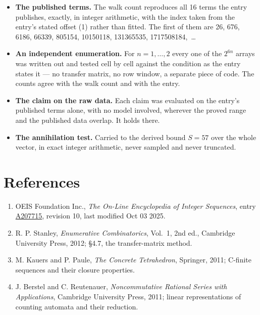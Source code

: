 \documentclass[11pt]{article}
\theoremstyle{definition}
\begin{document}
\begin{itemize}

\item {\bfseries The published terms.} The walk count reproduces all 16 terms the entry publishes, exactly, in integer arithmetic, with the index taken from the entry's stated offset (1) rather than fitted. The first of them are 26, 676, 6186, 66339, 805154, 10150118, 131365535, 1717508184,~\dots

\item {\bfseries An independent enumeration.} For $n = 1,\dots,2$ every one of the $2^{6n}$ arrays was written out and tested cell by cell against the condition as the entry states it --- no transfer matrix, no row window, a separate piece of code. The counts agree with the walk count and with the entry.

\item {\bfseries The claim on the raw data.} Each claim was evaluated on the entry's published terms alone, with no model involved, wherever the proved range and the published data overlap. It holds there.

\item {\bfseries The annihilation test.} Carried to the derived bound $S = 57$ over the whole vector, in exact integer arithmetic, never sampled and never truncated.

\end{itemize}

\section{References}

\begin{enumerate}

\item OEIS Foundation Inc., \emph{The On-Line Encyclopedia of Integer Sequences}, entry \href{https://oeis.org/A207715}{A207715}, revision 10, last modified Oct 03 2025.

\item R. P. Stanley, \emph{Enumerative Combinatorics}, Vol.~1, 2nd ed., Cambridge University Press, 2012; \S4.7, the transfer-matrix method.

\item M. Kauers and P. Paule, \emph{The Concrete Tetrahedron}, Springer, 2011; C-finite sequences and their closure properties.

\item J. Berstel and C. Reutenauer, \emph{Noncommutative Rational Series with Applications}, Cambridge University Press, 2011; linear representations of counting automata and their reduction.

\end{enumerate}
\end{document}
